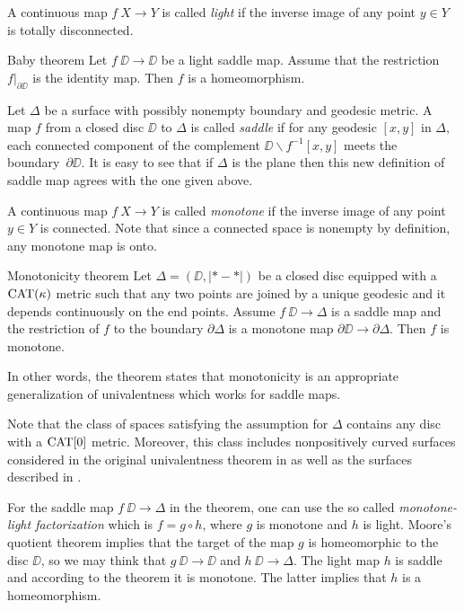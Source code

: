 \documentclass{article}
\begin{document}
A continuous map $f\:X\to Y$ is called \emph{light} if the inverse image of any point $y\in Y$ is totally disconnected.

\begin{thm}{Baby theorem}\label{baby}
Let $f\:\DD\to \DD$ be a light saddle map.
Assume that 
the restriction $f|_{\partial\DD}$ is the identity map.
Then $f$ is a homeomorphism.
\end{thm}

Let $\Delta$ be a surface with possibly nonempty boundary and geodesic metric.
A map $f$ from a closed disc $\DD$ to $\Delta$ is called \emph{saddle} 
if for any geodesic $[x,y]$ in $\Delta$, each connected component of the complement $\DD\backslash f^{-1}[x,y]$ meets the boundary~$\partial\DD$.
It is easy to see that if $\Delta$ is the plane then this new definition of saddle map agrees with the one given above.

A continuous map $f\:X\to Y$ is called \emph{monotone} if the inverse image of any point $y\in Y$ is connected.
Note that since a connected space is nonempty by definition, any monotone map is onto.

\begin{thm}{Monotonicity theorem}\label{thm:main}
Let $\Delta=(\DD,|{*}-{*}|)$ be a closed disc equipped with a $\mathop{\rm CAT}\nolimits(\kappa)$ metric 
such that any two points are joined by a unique geodesic and it depends continuously on the end points.
Assume $f\:\DD\to \Delta$ is a saddle map and the restriction of $f$ to the boundary $\partial\Delta$ is a monotone map 
$\partial\DD\to\partial\Delta$.
Then $f$ is monotone. 
\end{thm}

In other words, the theorem states that monotonicity is an appropriate generalization of univalentness which works for saddle maps.

Note that the class of spaces satisfying the assumption for $\Delta$ contains any disc with a $\mathop{\rm CAT}\nolimits[0]$ metric.
Moreover, this class includes nonpositively curved surfaces considered in the original univalentness theorem in \cite{schoen-yau}
as well as the surfaces described in \cite{jost}.

For the saddle map $f\:\DD\to \Delta$ in the theorem,
one can use the so called \emph{monotone-light factorization} \cite{eilenberg}
which is $f=g\circ h$,
where $g$ is monotone and $h$ is light.
Moore's quotient theorem \cite{moore} implies that the target of the map $g$ is homeomorphic to the disc $\DD$, so we may think that $g\:\DD\to \DD$ and $h\:\DD\to \Delta$.
The light map $h$ is saddle and according to the theorem it is monotone.
The latter implies that $h$ is a homeomorphism.
\end{document}
